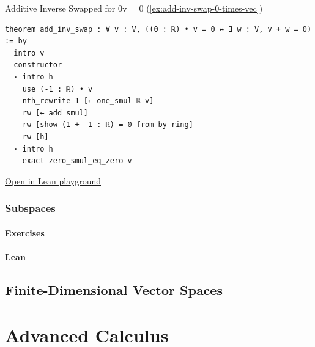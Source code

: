 \documentclass[12pt]{book}
\begin{document}
\newpage

\begin{leanbox}{Additive Inverse Swapped for 0v = 0 (\ref{ex:add-inv-swap-0-times-vec})} \label{lean:add-inv-swap-0-times-vec}
\begin{verbatim}
theorem add_inv_swap : ∀ v : V, ((0 : ℝ) • v = 0 ↔ ∃ w : V, v + w = 0) := by
  intro v
  constructor
  · intro h
    use (-1 : ℝ) • v
    nth_rewrite 1 [← one_smul ℝ v]
    rw [← add_smul]
    rw [show (1 + -1 : ℝ) = 0 from by ring]
    rw [h]
  · intro h
    exact zero_smul_eq_zero v
\end{verbatim}
\href{https://live.lean-lang.org/#codez=JYWwDg9gTgLgBAWQIYwBYBtgCMBQOBuSUwSW6ApnAN4BqcAXHACoCeY5AVAL5wDaAggBNBAYQggQAcSgQArmDg0AunwQRBsinEC4hIqV405aORBwAXuRkB9AM4hNV8gEcrFmQziAAIjj4PNADRwABQADB7aAJRwgEQEPnAAvHBh9IlYLDhwcMAAdjDu%2BBlwqEj4lKgeoeFRsb6JlYyRMXEA1MHJOtVxKXBphZm5qFZQ5ADuxDCUAIx8gAmEcEjCrpYQbVX6mZlQI3wLgrb26OtFJWUATBUh9I01cK0AtEGhV534UXVP1y1tz02vt3APD4vKLdXobOBbWZFI6Q3i7KzZcgAcysAGMkNlUeRDvN4KhToVYfCkDYbBBUYF4YiUejMdjKYs3BAVCgigTMuQAB5IVF404AOhsLAkeBwhmMpnhOXwthGSAUjG8vkYAWC9Q6vwSSTggBTCOCAYCI4NsVYFfK1tokQiDUulMjk8isCplURBsjY8rJedBCgB2rK5dyoPpwWQ2ShBO7TBovYMDIajcZTKGu8j7TQ6HxHTbbXhzeF2TRZiE5myoCDbILTe5RjWWuAAMxkpjSEJySKLsNQRz99sDwa5PPgTLT6EcLiZPiAA}{Open in Lean playground}
\end{leanbox}


\subsection{Subspaces}
\subsubsection{Exercises}
\subsubsection{Lean}

\section{Finite-Dimensional Vector Spaces}

\begin{definition}
    
\end{definition}








\chapter{Advanced Calculus}
\end{document}

